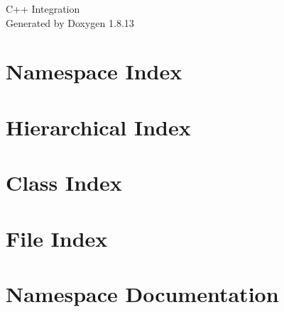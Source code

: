 \documentclass[twoside]{book}
\newcommand{\+}{\discretionary{\mbox{\scriptsize$\hookleftarrow$}}{}{}}
\newcommand{\clearemptydoublepage}{%
  \newpage{\pagestyle{empty}\cleardoublepage}%
}
\begin{document}
\hypersetup{pageanchor=false,
             bookmarksnumbered=true,
             pdfencoding=unicode
            }
\begin{titlepage}
\vspace*{7cm}
\begin{center}%
{\Large C++ Integration }\\
\vspace*{1cm}
{\large Generated by Doxygen 1.8.13}\\
\end{center}
\end{titlepage}
\clearemptydoublepage
{}
\tableofcontents
\clearemptydoublepage
{}
\hypersetup{pageanchor=true}

\chapter{Namespace Index}

\chapter{Hierarchical Index}

\chapter{Class Index}

\chapter{File Index}

\chapter{Namespace Documentation}


\end{document}
